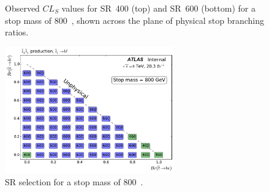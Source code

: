 \begin{figure}[ht]
  \centering
  \caption{
    Observed
    $CL_S$ values for SR~400 (top) and SR~600 (bottom) for a stop mass of
    800~\GeV,
    shown across the plane of physical stop branching ratios.
  }
\end{figure}

\begin{figure}[ht]
  \centering
  \includegraphics[width=0.65\textwidth]
    {figs/blstop/region_selection/region_choice_vs_br_m_800.pdf}
  \caption{
    SR selection for a stop mass of 800~\GeV.
  }
\end{figure}

